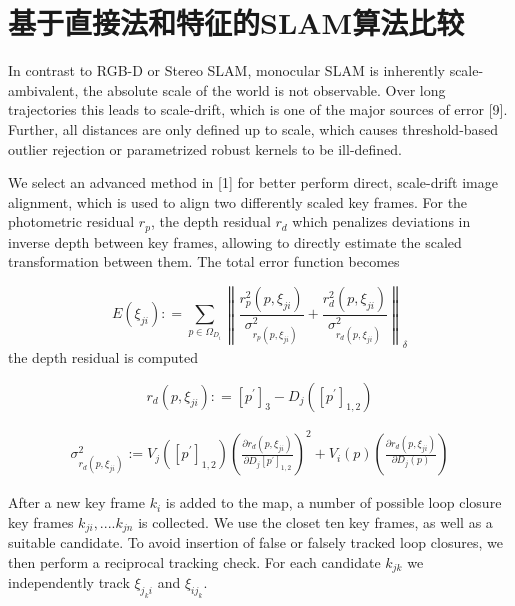 \section{基于直接法和特征的SLAM算法比较}
In contrast to RGB-D or Stereo SLAM, monocular SLAM is inherently scale-ambivalent, the absolute scale of the world is not observable. Over long trajectories this leads to scale-drift, which is one of the major sources of error [9]. Further, all distances are only defined up to scale, which causes threshold-based outlier rejection or parametrized robust kernels to be ill-defined.

We select an advanced method in [1] for better perform direct, scale-drift image alignment, which is used to align two differently scaled key frames. For the photometric residual ${r_p}$, the depth residual ${r_d}$ which penalizes deviations in inverse depth between key frames, allowing to directly estimate the scaled transformation between them. The total error function becomes

\begin{equation}
E({\xi _{ji}}): = {\sum\limits_{p \in {\Omega _{{D_i}}}} {\left\| {\frac{{r_p^2(p,{\xi _{ji}})}}{{\sigma _{{r_p}(p,{\xi _{ji}})}^2}} + \frac{{r_d^2(p,{\xi _{ji}})}}{{\sigma _{{r_d}(p,{\xi _{ji}})}^2}}} \right\|} _\delta }
\end{equation}
the depth residual is computed

\begin{equation}
r_{d}(p,\xi _{ji}): = [p^{'}]_{3} - D_{j}([p^{'}]_{1,2})
\end{equation}

\begin{equation}
\begin{split}
\sigma_{r_{d}(p,\xi_{ji})} ^{2} :=V_{j}( [ p^{'} ]_{1,2} )  {\left( \frac {\partial r_{d}(p,\xi_{ji})} {\partial D_{j} \left[ p^{'} \right]_{1,2}}  \right)^{2}} + V_{i}(p) \left( \frac {\partial r_{d}(p,\xi_{ji})} {\partial D_{j}(p)} \right)
\end{split}
\end{equation}

After a new key frame ${k_i}$ is added to the map, a number of possible loop closure key frames ${k_{ji}},....{k_{jn}}$ is collected. We use the closet ten key frames, as well as a suitable candidate. To avoid insertion of false or falsely tracked loop closures, we then perform a reciprocal tracking check. For each candidate ${k_{jk}}$ we independently track ${\xi _{{j_k}i}}$ and ${\xi _{i{j_k}}}$.

